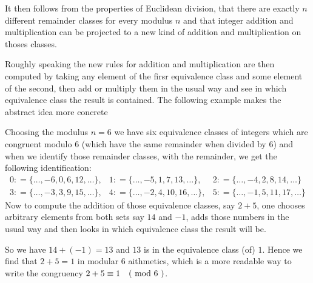 It then follows from the properties of Euclidean division, that there are exactly $ n $ different remainder classes for every modulus $n$ and that integer addition and multiplication can be projected to a new kind of addition and multiplication on thoses classes. 

Roughly speaking the new rules for addition and multiplication are then computed by taking any element of the firsr equivalence class and some element of the second, then add or multiply them in the usual way and see in which equivalence class the result is contained.
The following example makes the abstract idea more concrete
\begin{example} 
\label{def_residue_ring_z_6}
Choosing the modulus $ n = 6 $ we have six equivalence classes of integers which are congruent modulo $ 6 $ (which have the same remainder when divided by $6$) and when we identify those remainder classes, with the remainder, we get the following identification:
$$
\begin{array}{lll}
0: = \{\ldots, -6,0,6,12, \ldots \}, &
1: = \{\ldots, -5,1,7,13, \ldots \}, &
2: = \{\ldots, -4,2,8,14, \ldots \} \\
3: = \{\ldots, -3,3,9,15, \ldots \}, &
4: = \{\ldots, -2,4,10,16, \ldots \}, &
5: = \{\ldots, -1,5,11,17, \ldots \}
\end{array}
$$
Now to compute the addition of those equivalence classes, say $2+5$, one chooses arbitrary elements from both sets say $14$ and $-1$, adds those numbers in the usual way and then looks in which equivalence class the result will be. 

So we have $14+(-1)=13$ and $13$ is in the equivalence class (of) $1$. Hence we find that $2+5=1$ in modular $6$ aithmetics, which is a more readable way to write the congruency $2+5 \equiv 1 \quad \text{( mod } 6 \text{ )}$.


\end{example}
